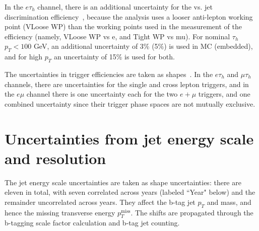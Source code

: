 In the $e\tau_{h}$ channel, there is an additional uncertainty for the vs. jet discrimination efficiency~\cite{twiki_TAU_POG_tauidrecommendationforrun2}, because the analysis uses a looser anti-lepton working point (VLoose WP) than the working points used in the measurement of the efficiency (namely, VLoose WP vs e, and Tight WP vs mu). For nominal $\tau_{h}$ $p_{T} < 100$ GeV, an additional uncertainty of 3\% (5\%) is used in MC (embedded), and for high $p_{T}$ an uncertainty of 15\% is used for both.

The uncertainties in trigger efficiencies are taken as shapes~\cite{twiki_TAU_POG_tauidrecommendationforrun2}. In the $e\tau_{h}$ and $\mu\tau_{h}$ channels, there are uncertainties for the single and cross lepton triggers, and in the $e\mu$ channel there is one uncertainty each for the two $e+\mu$ triggers, and one combined uncertainty since their trigger phase spaces are not mutually exclusive.

\section{Uncertainties from jet energy scale and resolution}
\label{section:JEC_sys}
The jet energy scale uncertainties are taken as shape uncertainties: there are eleven in total, with seven correlated across years (labeled ``Year" below) and the remainder uncorrelated across years. They affect the b-tag jet $p_{T}$ and mass, and hence the missing transverse energy $p_{T}^{\text{miss}}$. The shifts are propagated through the b-tagging scale factor calculation and b-tag jet counting. 

